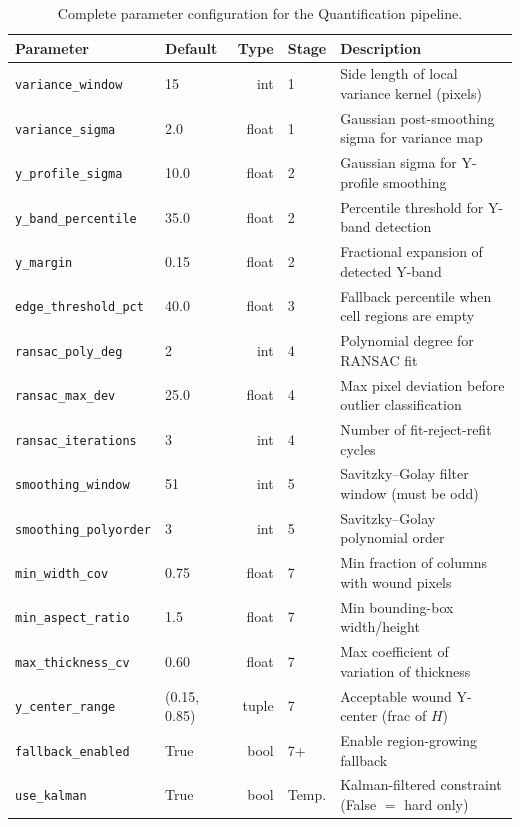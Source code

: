 \begin{table}[H]
  \centering
  \caption{Complete parameter configuration for the Quantification pipeline.}\label{tab:params}
  \small
  \begin{tabular}{llrlp{5.5cm}}
    \toprule
    Parameter & Default & Type & Stage & Description \\
    \midrule
    \texttt{variance\_window}   & 15    & int   & 1 & Side length of local variance kernel (pixels) \\
    \texttt{variance\_sigma}    & 2.0   & float & 1 & Gaussian post-smoothing sigma for variance map \\
    \texttt{y\_profile\_sigma}  & 10.0  & float & 2 & Gaussian sigma for Y-profile smoothing \\
    \texttt{y\_band\_percentile}& 35.0  & float & 2 & Percentile threshold for Y-band detection \\
    \texttt{y\_margin}          & 0.15  & float & 2 & Fractional expansion of detected Y-band \\
    \texttt{edge\_threshold\_pct}& 40.0 & float & 3 & Fallback percentile when cell regions are empty \\
    \texttt{ransac\_poly\_deg}  & 2     & int   & 4 & Polynomial degree for RANSAC fit \\
    \texttt{ransac\_max\_dev}   & 25.0  & float & 4 & Max pixel deviation before outlier classification \\
    \texttt{ransac\_iterations} & 3     & int   & 4 & Number of fit-reject-refit cycles \\
    \texttt{smoothing\_window}  & 51    & int   & 5 & Savitzky--Golay filter window (must be odd) \\
    \texttt{smoothing\_polyorder}& 3    & int   & 5 & Savitzky--Golay polynomial order \\
    \texttt{min\_width\_cov}    & 0.75  & float & 7 & Min fraction of columns with wound pixels \\
    \texttt{min\_aspect\_ratio} & 1.5   & float & 7 & Min bounding-box width/height \\
    \texttt{max\_thickness\_cv} & 0.60  & float & 7 & Max coefficient of variation of thickness \\
    \texttt{y\_center\_range}   & (0.15, 0.85) & tuple & 7 & Acceptable wound Y-center (frac of $H$) \\
    \texttt{fallback\_enabled}  & True  & bool  & 7+ & Enable region-growing fallback \\
    \addlinespace
    \texttt{use\_kalman}        & True  & bool  & Temp. & Kalman-filtered constraint (False $=$ hard only) \\

\end{tabular}
\end{table}
